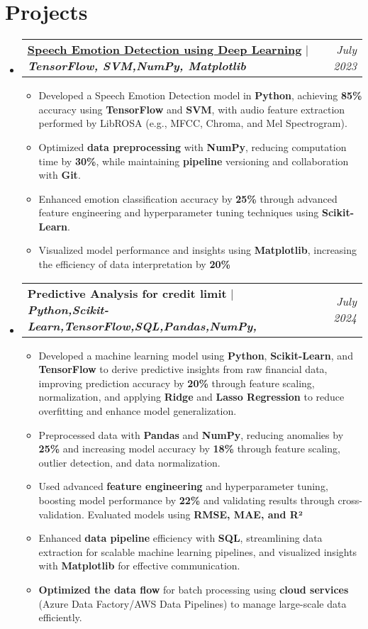 \documentclass[letterpaper,11pt]{article}
\makeatletter
\newcommand{\resumeItem}[1]{
  \item\small{
    {#1 \vspace{-2pt}}
  }
}
\newcommand{\resumeProjectHeading}[2]{
    \item
    \begin{tabular*}{0.97\textwidth}{l@{\extracolsep{\fill}}r}
      \small#1 & #2 \\
    \end{tabular*}\vspace{-7pt}
}
\newcommand{\resumeSubHeadingListStart}{\begin{itemize}[leftmargin=0.15in, label={}]}
\newcommand{\resumeSubHeadingListEnd}{\end{itemize}}
\newcommand{\resumeItemListStart}{\begin{itemize}}
\newcommand{\resumeItemListEnd}{\end{itemize}\vspace{-5pt}}
\makeatother
\begin{document}
\section{Projects}
    \resumeSubHeadingListStart
      \resumeProjectHeading
          {\textbf{\underline{\href{https://github.com/MK-Github03/Speech-Emotion_recognition-using-Deep-learning}{Speech Emotion Detection using Deep Learning}}} $|$ \emph{\textbf{\scriptsize  TensorFlow, \scriptsize SVM,\scriptsize NumPy, \scriptsize Matplotlib}}}{\textit{July 2023}}
          \resumeItemListStart
          \vspace{0.5em} %
            \resumeItem{Developed a Speech Emotion Detection model in \textbf{Python}, achieving \textbf{85\%} accuracy using \textbf{TensorFlow} and \textbf{SVM}, with audio feature extraction performed by LibROSA (e.g., MFCC, Chroma, and Mel Spectrogram).}
            \resumeItem{Optimized \textbf{data preprocessing} with \textbf{NumPy}, reducing computation time by \textbf{30\%}, while maintaining \textbf{pipeline} versioning and collaboration with \textbf{Git}.}
            \resumeItem{Enhanced emotion classification accuracy by \textbf{25\%} through advanced feature engineering and hyperparameter tuning techniques using \textbf{Scikit-Learn}.}
            \resumeItem{Visualized model performance and insights using \textbf{Matplotlib}, increasing the efficiency of data interpretation by \textbf{20\%}}
          \resumeItemListEnd
      \resumeProjectHeading
          {\textbf{Predictive Analysis for credit limit} $|$ \emph{\textbf{\scriptsize Python,\scriptsize Scikit-Learn,\scriptsize TensorFlow,\scriptsize SQL,\scriptsize Pandas,\scriptsize NumPy,}}}{\textit{July 2024}}
          \resumeItemListStart
           \vspace{0.5em}
           \resumeItem{Developed a machine learning model using \textbf{Python}, \textbf{Scikit-Learn}, and \textbf{TensorFlow} to derive predictive insights from raw financial data, improving prediction accuracy by \textbf{20\%} through feature scaling, normalization, and applying \textbf{Ridge} and \textbf{Lasso Regression} to reduce overfitting and enhance model generalization.}
            \resumeItem{Preprocessed data with \textbf{Pandas} and \textbf{NumPy}, reducing anomalies by \textbf{25\% }and increasing model accuracy by \textbf{18\%} through feature scaling, outlier detection, and data normalization.}
         
            \resumeItem{Used advanced \textbf{feature engineering} and hyperparameter tuning, boosting model performance by \textbf{22\%} and validating results through cross-validation. Evaluated models using \textbf{RMSE, MAE, and R²}}
            \resumeItem{Enhanced \textbf{data pipeline} efficiency with \textbf{SQL}, streamlining data extraction for scalable machine learning pipelines, and visualized insights with \textbf{Matplotlib} for effective communication.}
            \resumeItem{\textbf{Optimized the data flow} for batch processing using \textbf{cloud services} (Azure Data Factory/AWS Data Pipelines) to manage large-scale data efficiently.}
            
          \resumeItemListEnd
    \resumeSubHeadingListEnd
\end{document}
